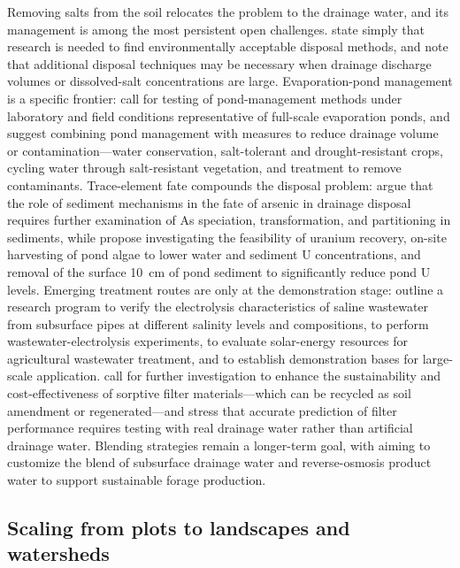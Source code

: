 \documentclass[11pt]{article}
\begin{document}
Removing salts from the soil relocates the problem to the drainage water, and its management is among the most persistent open challenges. \textcite{Ayars2014} state simply that research is needed to find environmentally acceptable disposal methods, and \textcite{Steppuhn2006} note that additional disposal techniques may be necessary when drainage discharge volumes or dissolved-salt concentrations are large. Evaporation-pond management is a specific frontier: \textcite{BRADFORD1991} call for testing of pond-management methods under laboratory and field conditions representative of full-scale evaporation ponds, and suggest combining pond management with measures to reduce drainage volume or contamination---water conservation, salt-tolerant and drought-resistant crops, cycling water through salt-resistant vegetation, and treatment to remove contaminants. Trace-element fate compounds the disposal problem: \textcite{Gao2007} argue that the role of sediment mechanisms in the fate of arsenic in drainage disposal requires further examination of As speciation, transformation, and partitioning in sediments, while \textcite{Duff1997} propose investigating the feasibility of uranium recovery, on-site harvesting of pond algae to lower water and sediment U concentrations, and removal of the surface 10~cm of pond sediment to significantly reduce pond U levels. Emerging treatment routes are only at the demonstration stage: \textcite{Yang2023} outline a research program to verify the electrolysis characteristics of saline wastewater from subsurface pipes at different salinity levels and compositions, to perform wastewater-electrolysis experiments, to evaluate solar-energy resources for agricultural wastewater treatment, and to establish demonstration bases for large-scale application. \textcite{Pugliese2023} call for further investigation to enhance the sustainability and cost-effectiveness of sorptive filter materials---which can be recycled as soil amendment or regenerated---and stress that accurate prediction of filter performance requires testing with real drainage water rather than artificial drainage water. Blending strategies remain a longer-term goal, with \textcite{Singh2020d} aiming to customize the blend of subsurface drainage water and reverse-osmosis product water to support sustainable forage production.

\subsection{Scaling from plots to landscapes and watersheds}
\end{document}
